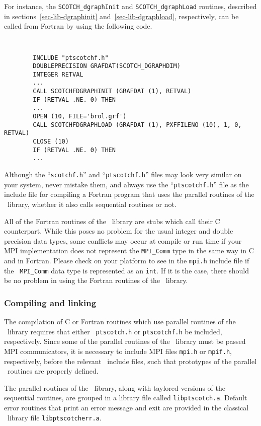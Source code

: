 For instance, the {\tt SCOTCH\_\lbt dgraph\lbt Init} and
{\tt SCOTCH\_\lbt dgraph\lbt Load} routines, described in
sections~\ref{sec-lib-dgraphinit} and~\ref{sec-lib-dgraphload},
respectively, can be called from Fortran by using the following code.
{\tt
\begin{verbatim}
        INCLUDE "ptscotchf.h"
        DOUBLEPRECISION GRAFDAT(SCOTCH_DGRAPHDIM)
        INTEGER RETVAL
        ...
        CALL SCOTCHFDGRAPHINIT (GRAFDAT (1), RETVAL)
        IF (RETVAL .NE. 0) THEN
        ...
        OPEN (10, FILE='brol.grf')
        CALL SCOTCHFDGRAPHLOAD (GRAFDAT (1), PXFFILENO (10), 1, 0, RETVAL)
        CLOSE (10)
        IF (RETVAL .NE. 0) THEN
        ...
\end{verbatim}
}

Although the ``{\tt scotchf.h}'' and ``{\tt ptscotchf.h}'' files may
look very similar on your system, never mistake them, and always use
the ``{\tt ptscotchf.h}'' file as the include file for compiling a
Fortran program that uses the parallel routines of the
\libscotch\ library, whether it also calls sequential routines or not.

All of the Fortran routines of the \libscotch\ library are stubs which
call their C counterpart. While this poses no problem for the usual
integer and double precision data types, some conflicts may occur at
compile or run time if your MPI implementation does not represent the
{\tt MPI\_Comm} type in the same way in C and in Fortran. Please check
on your platform to see in the {\tt mpi.h} include file if the {\tt
MPI\_Comm} data type is represented as an {\tt int}. If it is the
case, there should be no problem in using the Fortran routines of
the \ptscotch\ library.

\subsubsection{Compiling and linking}

The compilation of C or Fortran routines which use parallel
routines of the \libscotch\ library requires that either {\tt
ptscotch.h} or {\tt ptscotchf.h} be included, respectively. Since some
of the parallel routines of the \libscotch\ library must be passed MPI
communicators, it is necessary to include MPI files {\tt mpi.h} or
{\tt mpif.h}, respectively, before the relevant \ptscotch\ include
files, such that prototypes of the parallel \libscotch\ routines are
properly defined.

The parallel routines of the \libscotch\ library, along with
taylored versions of the sequential routines, are grouped in a
library file called {\tt libptscotch.a}. Default error routines that
print an error message and exit are provided in the classical
\scotch\ library file {\tt libptscotcherr.a}.

